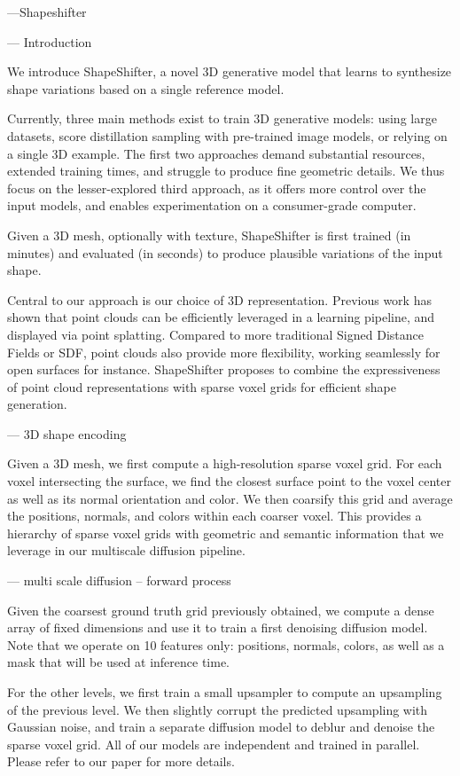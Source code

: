 ---Shapeshifter

--- Introduction

We introduce ShapeShifter, a novel 3D generative model that learns to synthesize shape variations based on a single reference model.

Currently, three main methods exist to train 3D generative models: using large datasets, score distillation sampling with pre-trained image models, or relying on a single 3D example. The first two approaches demand substantial resources, extended training times, and struggle to produce fine geometric details. We thus focus on the lesser-explored third approach, as it offers more control over the input models, and enables experimentation on a consumer-grade computer.

Given a 3D mesh, optionally with texture, ShapeShifter is first trained (in minutes) and evaluated (in seconds) to produce plausible variations of the input shape.

Central to our approach is our choice of 3D representation. Previous work has shown that point clouds can be efficiently leveraged in a learning pipeline, and displayed via point splatting. Compared to more traditional Signed Distance Fields or SDF, point clouds also provide more flexibility, working seamlessly for open surfaces for instance. ShapeShifter proposes to combine the expressiveness of point cloud representations with sparse voxel grids for efficient shape generation.

--- 3D shape encoding

Given a 3D mesh, we first compute a high-resolution sparse voxel grid. For each voxel intersecting the surface, we find the closest surface point to the voxel center as well as its normal orientation and color. We then coarsify this grid and average the positions, normals, and colors within each coarser voxel. This provides a hierarchy of sparse voxel grids with geometric and semantic information that we leverage in our multiscale diffusion pipeline.

--- multi scale diffusion
-- forward process

Given the coarsest ground truth grid previously obtained, we compute a dense array of fixed dimensions and use it to train a first denoising diffusion model. Note that we operate on 10 features only: positions, normals, colors, as well as a mask that will be used at inference time.

For the other levels, we first train a small upsampler to compute an upsampling of the previous level. We then slightly corrupt the predicted upsampling with Gaussian noise, and train a separate diffusion model to deblur and denoise the sparse voxel grid. All of our models are independent and trained in parallel. Please refer to our paper for more details.

